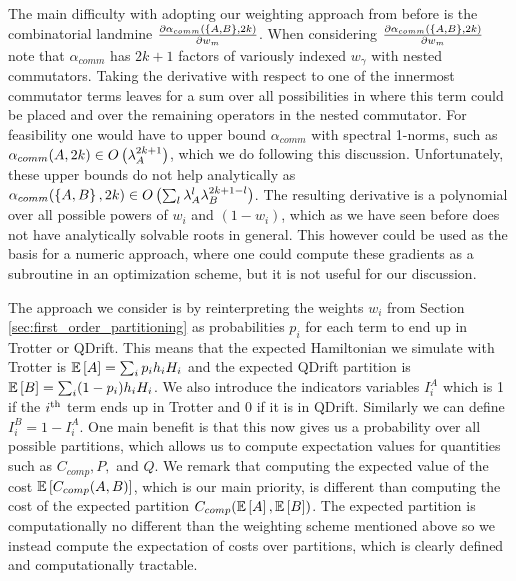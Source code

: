 The main difficulty with adopting our weighting approach from before is the combinatorial landmine $\frac{\partial \alpha_{comm}(\left\{ A,B \right\}, 2k)}{\partial w_m}$. When considering $\frac{\partial \alpha_{comm}(\left\{ A,B \right\}, 2k)}{\partial w_m}$ note that $\alpha_{comm}$ has $2k+1$ factors of variously indexed $w_{\gamma}$ with nested commutators. Taking the derivative with respect to one of the innermost commutator terms leaves for a sum over all possibilities in where this term could be placed and over the remaining operators in the nested commutator. For feasibility one would have to upper bound $\alpha_{comm}$ with spectral 1-norms, such as $\alpha_{comm}(A, 2k) \in O\left( \lambda_A^{2k+1} \right)$, which we do following this discussion. Unfortunately, these upper bounds do not help analytically as $\alpha_{comm}(\left\{ A,B \right\}, 2k) \in O\left( \sum_l \lambda_{A}^{l} \lambda_B^{2k+1-l} \right)$. The resulting derivative is a polynomial over all possible powers of $w_i$ and $(1-w_i)$, which as we have seen before does not have analytically solvable roots in general. This however could be used as the basis for a numeric approach, where one could compute these gradients as a subroutine in an optimization scheme, but it is not useful for our discussion.

The approach we consider is by reinterpreting the weights $w_i$ from Section \ref{sec:first_order_partitioning} as probabilities $p_i$ for each term to end up in Trotter or QDrift. This means that the expected Hamiltonian we simulate with Trotter is $\mathbb{E}\left[ A \right] = \sum_i p_i h_i H_i$ and the expected QDrift partition is $\mathbb{E}\left[ B \right] = \sum_i (1-p_i) h_i H_i$. We also introduce the indicators variables $I_i^A$ which is 1 if the $i\textsuperscript{th}$ term ends up in Trotter and 0 if it is in QDrift. Similarly we can define $I_i^B = 1 - I_i^A$. One main benefit is that this now gives us a probability over all possible partitions, which allows us to compute expectation values for quantities such as $C_{comp}, P,$ and $Q$. We remark that computing the expected value of the cost $\mathbb{E}\left[ C_{comp}(A,B) \right]$, which is our main priority, is different than computing the cost of the expected partition $C_{comp}(\mathbb{E}\left[ A \right], \mathbb{E}\left[ B \right])$. The expected partition is computationally no different than the weighting scheme mentioned above so we instead compute the expectation of costs over partitions, which is clearly defined and computationally tractable.  

